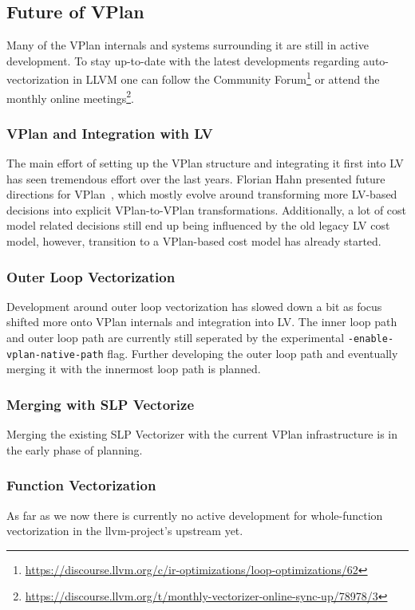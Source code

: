 \documentclass[sigplan,11pt,nonacm]{acmart}
\begin{document}
\subsection{Future of VPlan}
Many of the VPlan internals and systems surrounding it are still in active development. To stay
up-to-date with the latest developments regarding auto-vectorization in LLVM one can follow the 
Community Forum\footnote{\url{https://discourse.llvm.org/c/ir-optimizations/loop-optimizations/62}} or
attend the monthly online 
meetings\footnote{\url{https://discourse.llvm.org/t/monthly-vectorizer-online-sync-up/78978/3}}.

\subsubsection{VPlan and Integration with LV}
The main effort of setting up the VPlan structure and integrating it first into LV has seen
tremendous effort over the last years. Florian Hahn presented future directions for 
VPlan~\cite{llvmvplanupdate}, which mostly evolve around transforming more LV-based decisions into
explicit VPlan-to-VPlan transformations. Additionally, a lot of cost model related decisions 
still end up being influenced by the old legacy LV cost model, however, transition to a VPlan-based 
cost model has already started.

\subsubsection{Outer Loop Vectorization}
Development around outer loop vectorization has slowed down a bit as focus shifted more onto VPlan
internals and integration into LV. The inner loop path and outer loop path are currently still
seperated by the experimental \texttt{-enable-vplan-native-path} flag. Further developing the 
outer loop path and eventually merging it with the innermost loop path is planned.

\subsubsection{Merging with SLP Vectorize}
Merging the existing SLP Vectorizer with the current VPlan infrastructure is in the early phase
of planning.

\subsubsection{Function Vectorization}
As far as we now there is currently no active development for whole-function vectorization in the
llvm-project's upstream yet.
\end{document}
